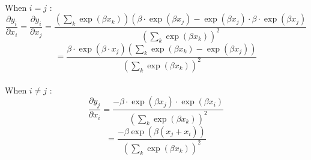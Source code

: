 \documentclass{article}
\begin{document}
\\When $i = j$ :
\[\frac { \partial y _ { i } } { \partial x _ { i } } = \frac { \partial y _ { i } } { \partial x _ { j } } = \frac { \left( \sum _ { k } \exp \left( \beta x _ { k } \right) \right) \left( \beta\cdot \exp \left( \beta x _ { j } \right) - \exp \left( \beta x _ { j } \right) \cdot \beta \cdot \exp \left( \beta x _ { j } \right) \right. } { \left( \sum _ { k } \exp \left( \beta x _ { k } \right) \right) ^ { 2 } }\]
\[=\frac{\beta \cdot \exp \left( \beta \cdot x _ { j } \right) \left( \sum _ { k } \exp \left( \beta x _ { k } \right) - \exp \left( \beta x _ { j } \right) \right)}{\left( \sum _ { k } \exp \left( \beta x _ { k } \right) \right) ^ { 2 }}\]
\\When $i \neq j$ :
\[\frac { \partial y _ { j } } { \partial x _ { i } } = \frac { - \beta \cdot \exp \left( \beta x _ { j } \right) \cdot \exp \left( \beta x _ { i } \right) } { \left( \sum _ { k } \exp \left( \beta x _ { k } \right) \right) ^ { 2 } }\]
\[= \frac { - \beta \exp \left( \beta \left( x _ { j } + x _ { i } \right) \right) } { \left( \sum _ { k } \exp \left( \beta x _ { k } \right) \right) ^ { 2 } }\]
\end{document}
